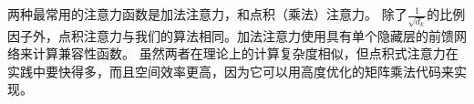 
两种最常用的注意力函数是加法注意力\citep{bahdanau2014neural}，和点积（乘法）注意力。 除了$\frac{1}{\sqrt{d_k}}$的比例因子外，点积注意力与我们的算法相同。加法注意力使用具有单个隐藏层的前馈网络来计算兼容性函数。 虽然两者在理论上的计算复杂度相似，但点积式注意力在实践中要快得多，而且空间效率更高，因为它可以用高度优化的矩阵乘法代码来实现。





